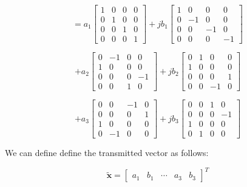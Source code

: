 \documentclass[fleqn]{article}
\begin{document}
\begin{enumerate}
\begin{enumerate}
			\begin{equation*}
				= a_1\begin{bmatrix}
					1 & 0 & 0 & 0 \\
					0 & 1 & 0 & 0 \\
					0 & 0 & 1 & 0 \\
					0 & 0 & 0 & 1
				\end{bmatrix} + jb_1\begin{bmatrix}
					1 &  0 &  0 &  0 \\
					0 & -1 &  0 &  0 \\
					0 &  0 & -1 &  0 \\
					0 &  0 &  0 & -1
				\end{bmatrix}
			\end{equation*}
			
			\begin{equation*}
				 + a_2\begin{bmatrix}
					0 & -1 & 0 &  0 \\
					1 &  0 & 0 &  0 \\
					0 &  0 & 0 & -1 \\
					0 &  0 & 1 &  0
				\end{bmatrix} + jb_2\begin{bmatrix}
					0 & 1 &  0 & 0 \\
					1 & 0 &  0 & 0 \\
					0 & 0 &  0 & 1 \\
					0 & 0 & -1 & 0
				\end{bmatrix}
			\end{equation*}
			
			\begin{equation*}
				+ a_3\begin{bmatrix}
					0 &  0 & -1 & 0 \\
					0 &  0 &  0 & 1 \\
					1 &  0 &  0 & 0 \\
					0 & -1 &  0 & 0
				\end{bmatrix} + jb_3\begin{bmatrix}
					0 & 0 & 1 &  0 \\
					0 & 0 & 0 & -1 \\
					1 & 0 & 0 &  0 \\
					0 & 1 & 0 &  0
				\end{bmatrix}
			\end{equation*}
			
			We can define define the transmitted vector as follows:
			
			\begin{equation*}
				\mathbf{\tilde{x}} = \begin{bmatrix}
					a_1 & b_1 & \cdots & a_3 & b_3
				\end{bmatrix}^T
			\end{equation*}
			

\end{enumerate}
\end{enumerate}
\end{document}
